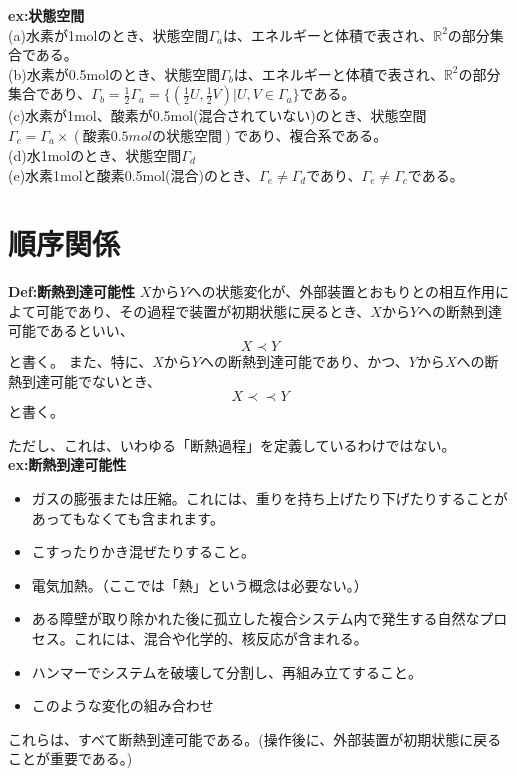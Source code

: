 \documentclass[a4paper,11pt]{jsarticle}
\begin{document}
\textbf{ex:状態空間}\\
(a)水素が1molのとき、状態空間$\Gamma_a$は、エネルギーと体積で表され、$\mathbb{{R}}^2$の部分集合である。\\
(b)水素が0.5molのとき、状態空間$\Gamma_b$は、エネルギーと体積で表され、$\mathbb{{R}}^2$の部分集合であり、$\Gamma_b=\frac{1}{2}\Gamma_a=\{(\frac{1}{2}U,\frac{1}{2}V)|U,V \in \Gamma_a\}$である。\\
(c)水素が1mol、酸素が0.5mol(混合されていない)のとき、状態空間$\Gamma_c=\Gamma_a \times (酸素0.5molの状態空間)$であり、複合系である。\\
(d)水1molのとき、状態空間$\Gamma_d$\\
(e)水素1molと酸素0.5mol(混合)のとき、$\Gamma_e\neq \Gamma_d$であり、$\Gamma_e\neq \Gamma_c$である。\\

\section{順序関係}
\begin{itembox}[l]{\textbf{Def:断熱到達可能性}}
    $X$から$Y$への状態変化が、外部装置とおもりとの相互作用によて可能であり、その過程で装置が初期状態に戻るとき、$X$から$Y$への断熱到達可能であるといい、
    \begin{equation}
        X \prec Y
    \end{equation}
    と書く。
    また、特に、$X$から$Y$への断熱到達可能であり、かつ、$Y$から$X$への断熱到達可能でないとき、
    \begin{equation}
        X \prec \prec Y
    \end{equation}
    と書く。
\end{itembox}
ただし、これは、いわゆる「断熱過程」を定義しているわけではない。\\

\textbf{ex:断熱到達可能性}\\
\begin{itemize}
    \item ガスの膨張または圧縮。これには、重りを持ち上げたり下げたりすることがあってもなくても含まれます。
    \item こすったりかき混ぜたりすること。
    \item 電気加熱。（ここでは「熱」という概念は必要ない。）
    \item ある障壁が取り除かれた後に孤立した複合システム内で発生する自然なプロセス。これには、混合や化学的、核反応が含まれる。
    \item ハンマーでシステムを破壊して分割し、再組み立てすること。
    \item このような変化の組み合わせ
\end{itemize}
これらは、すべて断熱到達可能である。(操作後に、外部装置が初期状態に戻ることが重要である。)\\
\end{document}

